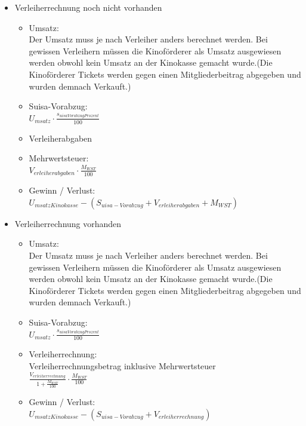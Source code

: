 \documentclass[
]{article}
\providecommand{\tightlist}{%
  \setlength{\itemsep}{0pt}\setlength{\parskip}{0pt}}
\begin{document}
\begin{itemize}
\tightlist
\item
  Verleiherrechnung noch nicht vorhanden

  \begin{itemize}
  \tightlist
  \item
    Umsatz:\\
    Der Umsatz muss je nach Verleiher anders berechnet werden. Bei
    gewissen Verleihern müssen die Kinoförderer als Umsatz ausgewiesen
    werden obwohl kein Umsatz an der Kinokasse gemacht wurde.(Die
    Kinoförderer Tickets werden gegen einen Mitgliederbeitrag abgegeben
    und wurden demnach Verkauft.)
  \item
    Suisa-Vorabzug:\\
    \(U_{msatz}\cdot  \frac {s_{uisaVorabzugProzent}}{100}\)
  \item
    Verleiherabgaben\\
  \item
    Mehrwertsteuer:\\
    \(V_{erleiherabgaben}\cdot \frac{M_{WST}}{100}\)
  \item
    Gewinn / Verlust:\\
    \(U_{msatzKinokasse} - (S_{uisa-Vorabzug} + V_{erleiherabgaben} + M_{WST})\)
  \end{itemize}
\item
  Verleiherrechnung vorhanden

  \begin{itemize}
  \tightlist
  \item
    Umsatz:\\
    Der Umsatz muss je nach Verleiher anders berechnet werden. Bei
    gewissen Verleihern müssen die Kinoförderer als Umsatz ausgewiesen
    werden obwohl kein Umsatz an der Kinokasse gemacht wurde.(Die
    Kinoförderer Tickets werden gegen einen Mitgliederbeitrag abgegeben
    und wurden demnach Verkauft.)
  \item
    Suisa-Vorabzug:\\
    \(U_{msatz}\cdot  \frac {s_{uisaVorabzugProzent}}{100}\)
  \item
    Verleiherrechnung:\\
    Verleiherrechnungsbetrag inklusive Mehrwertsteuer\\
    \(\frac {V_{erleiherrechnung}}{1+\frac{M_{WST}}{100}}\cdot\frac{M_{WST}}{100}\)
  \item
    Gewinn / Verlust:\\
    \(U_{msatzKinokasse} - (S_{uisa-Vorabzug} + V_{erleiherrechnung})\)
  \end{itemize}
\end{itemize}
\end{document}
